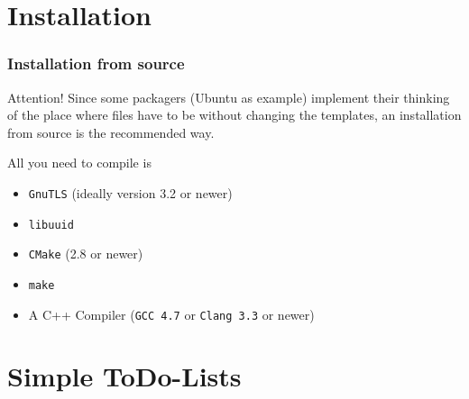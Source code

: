 \documentclass[t,handout]{beamer}
\begin{document}
\section{Installation}

\begin{frame}[fragile]\frametitle{Installation from source}

    \begin{alertblock}{Attention!}
    Since some packagers (Ubuntu as example) implement their thinking of the place where files have to be without changing the templates, an installation from source is the recommended way.
    \end{alertblock}
    \pause

    All you need to compile is
    \begin{itemize}
        \item \verb+GnuTLS+ (ideally version 3.2 or newer)
        \item \verb+libuuid+
        \item \verb+CMake+ (2.8 or newer)
        \item \verb+make+
        \item A C++ Compiler (\verb+GCC 4.7+ or \verb+Clang 3.3+ or newer)
    \end{itemize}

\end{frame}



\section{Simple ToDo-Lists}
\end{document}
